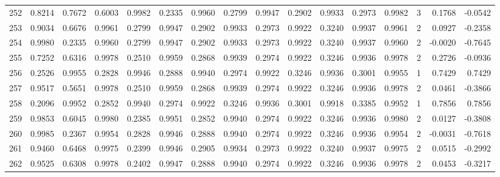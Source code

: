 \begin{tabular}{lrrrrrrrrrrrrrrr}
252 &      0.8214 &  0.7672 &  0.6003 &  0.9982 &  0.2335 &  0.9960 &  0.2799 &  0.9947 &  0.2902 &  0.9933 &   0.2973 &     0.9982 &      3 &                    0.1768 &                    -0.0542 \\
253 &      0.9034 &  0.6676 &  0.9961 &  0.2799 &  0.9947 &  0.2902 &  0.9933 &  0.2973 &  0.9922 &  0.3240 &   0.9937 &     0.9961 &      2 &                    0.0927 &                    -0.2358 \\
254 &      0.9980 &  0.2335 &  0.9960 &  0.2799 &  0.9947 &  0.2902 &  0.9933 &  0.2973 &  0.9922 &  0.3240 &   0.9937 &     0.9960 &      2 &                   -0.0020 &                    -0.7645 \\
255 &      0.7252 &  0.6316 &  0.9978 &  0.2510 &  0.9959 &  0.2868 &  0.9939 &  0.2974 &  0.9922 &  0.3246 &   0.9936 &     0.9978 &      2 &                    0.2726 &                    -0.0936 \\
256 &      0.2526 &  0.9955 &  0.2828 &  0.9946 &  0.2888 &  0.9940 &  0.2974 &  0.9922 &  0.3246 &  0.9936 &   0.3001 &     0.9955 &      1 &                    0.7429 &                     0.7429 \\
257 &      0.9517 &  0.5651 &  0.9978 &  0.2510 &  0.9959 &  0.2868 &  0.9939 &  0.2974 &  0.9922 &  0.3246 &   0.9936 &     0.9978 &      2 &                    0.0461 &                    -0.3866 \\
258 &      0.2096 &  0.9952 &  0.2852 &  0.9940 &  0.2974 &  0.9922 &  0.3246 &  0.9936 &  0.3001 &  0.9918 &   0.3385 &     0.9952 &      1 &                    0.7856 &                     0.7856 \\
259 &      0.9853 &  0.6045 &  0.9980 &  0.2385 &  0.9951 &  0.2852 &  0.9940 &  0.2974 &  0.9922 &  0.3246 &   0.9936 &     0.9980 &      2 &                    0.0127 &                    -0.3808 \\
260 &      0.9985 &  0.2367 &  0.9954 &  0.2828 &  0.9946 &  0.2888 &  0.9940 &  0.2974 &  0.9922 &  0.3246 &   0.9936 &     0.9954 &      2 &                   -0.0031 &                    -0.7618 \\
261 &      0.9460 &  0.6468 &  0.9975 &  0.2399 &  0.9946 &  0.2905 &  0.9934 &  0.2973 &  0.9922 &  0.3240 &   0.9937 &     0.9975 &      2 &                    0.0515 &                    -0.2992 \\
262 &      0.9525 &  0.6308 &  0.9978 &  0.2402 &  0.9947 &  0.2888 &  0.9940 &  0.2974 &  0.9922 &  0.3246 &   0.9936 &     0.9978 &      2 &                    0.0453 &                    -0.3217 \\

\end{tabular}
